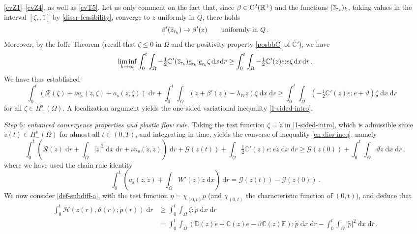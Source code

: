\documentclass[a4paper,10pt,reqno]{amsart}
\numberwithin{equation}{section}
\newcommand{\R}{\mathbb{R}}
\numberwithin{equation}{section}
\def\calG{{\mathcal G}} \def\calH{{\mathcal H}} \def\calI{{\mathcal I}}
\def\dd{\;\!\mathrm{d}} %
\newcommand{\teta}{\vartheta}
\newcommand{\piecewiseConstant}[2]{\overline{#1}_{\kern-1pt#2}}
\newcommand{\pwc}{\piecewiseConstant}
\newcommand{\upiecewiseConstant}[2]{\underline{#1}_{\kern-1pt#2}}
\newcommand{\upwc}{\upiecewiseConstant}
\newcommand{\bbC}{\mathbb{C}}
\newcommand{\bbD}{\mathbb{D}}
\newcommand{\bbE}{\mathbb{E}}
\newcommand{\Dip}[3]{\mathcal{H}(#1,#2;#3)}
\newcommand{\Did}[1]{\mathcal{R}(#1)}
\newcommand{\ass}{a_{\mathrm{s}}}
\begin{document}
   \eqref{cvZ1}--\eqref{cvZ4}, as well as \eqref{cvT5}. 
   Let us only comment on the fact that, since $\beta \in \rmC^2(\R^+)$ and 
   the functions $(\pwc z{\tau_k})_k$, taking  values  in  the interval $[\zeta_*,1]$ by \eqref{discr-feasibility}, 
   converge to $z$ uniformly in $Q$, there holds
   \begin{equation}
   \label{unif-beta-conv}
   \beta'(\pwc z{\tau_k}) \to \beta'(z) \qquad \text{uniformly in }Q\,.
   \end{equation}
   Moreover, by the Ioffe Theorem  (recall that 
   $\zeta \leq 0$ in $\Omega$ and the positivity property \eqref{posbbC} of $\bbC'$),
  we have 
  \[
  \liminf_{k\to\infty}
   \int_0^t \int_\Omega  {-}\tfrac12 \bbC'(\pwc z{\tau_k}) \upwc e{\tau_k}{:} \upwc e{\tau_k} \zeta \dd x  \dd r
   \geq \int_0^t  \int_\Omega {-}\tfrac12 \bbC'(z) e{:} e \zeta \dd x \dd r\,.
  \]
  We have thus established
  \[
 \int_0^t  
 \left(
 \Did{\zeta}  {+} \nu \ass( \dot z,\zeta) {+} \ass(z,\zeta)   \right) \dd  r + \int_0^t  \int_\Omega 
 \left(
 \dot z   {+}\beta'(z)
  {-} \lambda_W z  \right)   \zeta \dd x  \dd r \geq \int_0^t  \int_\Omega 
 \left( {-}\tfrac12 \bbC'(z) e{:}e {+} \teta \right) \zeta \dd x \dd r  \quad 
  \]
for all $  \zeta \in H_-^{\mathrm{s}}(\Omega).$ 
 A localization argument yields the one-sided variational inequality \eqref{1-sided-intro}. 
 \par\noindent
 \emph{Step $6$: enhanced convergence properties and plastic flow rule.}   
 Taking the test function $\zeta = \dot{z}$ in  \eqref{1-sided-intro}, which is admissible since $\dot{z}(t) \in 
 H_-^{\mathrm{s}}(\Omega)$ for almost all $t \in (0,T)$, and integrating in time, yields 
 the converse of inequality \eqref{en-diss-ineq},
 namely
   \begin{equation}
 \label{lee-z}
 \int_0^t \left(  \Did{\dot{z}} \dd r {+}  \int_\Omega |\dot{z}|^2 \dd x \dd r
   {+} \nu  \ass (\dot{z}, \dot{z})  \right) \dd r 
   + \calG(z(t)) + \int_\Omega  \tfrac12 \bbC'(z) e {:}e \dot{z} \dd x \dd r   \geq  \calG(z(0))  + 
   \int_0^t \int_\Omega   \teta  \dot{z}  \dd x \dd r\,,
 \end{equation}
 where we have used the chain rule identity
 \[
 \int_0^t \left( \ass (z,\dot{z}) {+} \int_\Omega W'(z) \dot{z} \dd x \right) \dd r = \calG(z(t))  - 
 \calG(z(0))\,. 
 \]
 We now consider 
 \eqref{def-subdiff-a}, with the test function $\eta = \chi_{(0,t)} \dot{p}$ (and $\chi_{(0,t)}$ the characteristic
 function of $(0,t)$), 
 and deduce that 
    \begin{equation}
 \label{lee-p}
 \begin{aligned}
 \int_0^t \Dip{z(r)}{\teta(r)}{ \dot{p}(r)} \dd r   & \geq  
 \int_0^t \int_\Omega \zeta{:} \dot{p} \dd x \dd r
 \\ & 
  =  \int_0^t \int_\Omega \left( \bbD(z) \dot{e} {+} \bbC(z) e {-}\teta \bbC(z) \bbE \right) {:} \dot{p} \dd x \dd r 
  -\int_0^t \int_\Omega |\dot{p}|^2 \dd x \dd r \,.
  \end{aligned}
    \end{equation}
\end{document}
